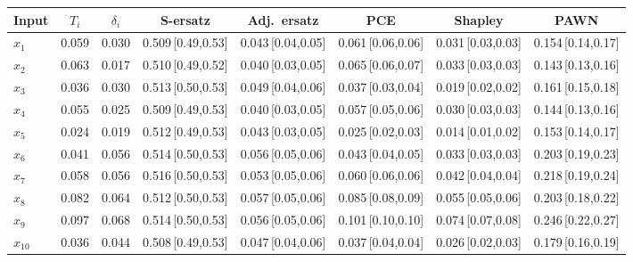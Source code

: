 \documentclass[11pt,a4paper]{article}
\begin{document}
\begin{table}[H]\centering\footnotesize
\begin{tabular}{@{}lccccccc@{}}\toprule
Input & $T_i$ & $\delta_i$ & S-ersatz & Adj.\ ersatz & PCE & Shapley & PAWN \\ \midrule
$x_{1}$ & 0.059 & 0.030 & 0.509\,{\scriptsize[0.49,0.53]} & 0.043\,{\scriptsize[0.04,0.05]} & 0.061\,{\scriptsize[0.06,0.06]} & 0.031\,{\scriptsize[0.03,0.03]} & 0.154\,{\scriptsize[0.14,0.17]} \\
$x_{2}$ & 0.063 & 0.017 & 0.510\,{\scriptsize[0.49,0.52]} & 0.040\,{\scriptsize[0.03,0.05]} & 0.065\,{\scriptsize[0.06,0.07]} & 0.033\,{\scriptsize[0.03,0.03]} & 0.143\,{\scriptsize[0.13,0.16]} \\
$x_{3}$ & 0.036 & 0.030 & 0.513\,{\scriptsize[0.50,0.53]} & 0.049\,{\scriptsize[0.04,0.06]} & 0.037\,{\scriptsize[0.03,0.04]} & 0.019\,{\scriptsize[0.02,0.02]} & 0.161\,{\scriptsize[0.15,0.18]} \\
$x_{4}$ & 0.055 & 0.025 & 0.509\,{\scriptsize[0.49,0.53]} & 0.040\,{\scriptsize[0.03,0.05]} & 0.057\,{\scriptsize[0.05,0.06]} & 0.030\,{\scriptsize[0.03,0.03]} & 0.144\,{\scriptsize[0.13,0.16]} \\
$x_{5}$ & 0.024 & 0.019 & 0.512\,{\scriptsize[0.49,0.53]} & 0.043\,{\scriptsize[0.03,0.05]} & 0.025\,{\scriptsize[0.02,0.03]} & 0.014\,{\scriptsize[0.01,0.02]} & 0.153\,{\scriptsize[0.14,0.17]} \\
$x_{6}$ & 0.041 & 0.056 & 0.514\,{\scriptsize[0.50,0.53]} & 0.056\,{\scriptsize[0.05,0.06]} & 0.043\,{\scriptsize[0.04,0.05]} & 0.033\,{\scriptsize[0.03,0.03]} & 0.203\,{\scriptsize[0.19,0.23]} \\
$x_{7}$ & 0.058 & 0.056 & 0.516\,{\scriptsize[0.50,0.53]} & 0.053\,{\scriptsize[0.05,0.06]} & 0.060\,{\scriptsize[0.06,0.06]} & 0.042\,{\scriptsize[0.04,0.04]} & 0.218\,{\scriptsize[0.19,0.24]} \\
$x_{8}$ & 0.082 & 0.064 & 0.512\,{\scriptsize[0.50,0.53]} & 0.057\,{\scriptsize[0.05,0.06]} & 0.085\,{\scriptsize[0.08,0.09]} & 0.055\,{\scriptsize[0.05,0.06]} & 0.203\,{\scriptsize[0.18,0.22]} \\
$x_{9}$ & 0.097 & 0.068 & 0.514\,{\scriptsize[0.50,0.53]} & 0.056\,{\scriptsize[0.05,0.06]} & 0.101\,{\scriptsize[0.10,0.10]} & 0.074\,{\scriptsize[0.07,0.08]} & 0.246\,{\scriptsize[0.22,0.27]} \\
$x_{10}$ & 0.036 & 0.044 & 0.508\,{\scriptsize[0.49,0.53]} & 0.047\,{\scriptsize[0.04,0.06]} & 0.037\,{\scriptsize[0.04,0.04]} & 0.026\,{\scriptsize[0.02,0.03]} & 0.179\,{\scriptsize[0.16,0.19]} \\

\end{tabular}
\end{table}
\end{document}
